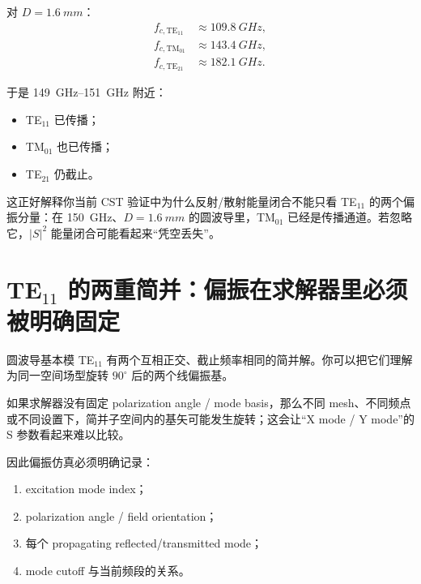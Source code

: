\documentclass[11pt,a4paper,openany]{ctexrep}
\begin{document}
对 $D=\SI{1.6}{mm}$：
\[
\boxed{
\begin{aligned}
f_{c,\mathrm{TE}_{11}}&\approx\SI{109.8}{GHz},\\
f_{c,\mathrm{TM}_{01}}&\approx\SI{143.4}{GHz},\\
f_{c,\mathrm{TE}_{21}}&\approx\SI{182.1}{GHz}.
\end{aligned}}
\]

于是 \SIrange{149}{151}{GHz} 附近：
\begin{itemize}
  \item TE$_{11}$ 已传播；
  \item TM$_{01}$ 也已传播；
  \item TE$_{21}$ 仍截止。
\end{itemize}

\begin{projectbox}
这正好解释你当前 CST 验证中为什么反射/散射能量闭合不能只看 TE$_{11}$ 的两个偏振分量：在 \SI{150}{GHz}、$D=\SI{1.6}{mm}$ 的圆波导里，TM$_{01}$ 已经是传播通道。若忽略它，$|S|^2$ 能量闭合可能看起来“凭空丢失”。
\end{projectbox}

\section{TE$_{11}$ 的两重简并：偏振在求解器里必须被明确固定}

圆波导基本模 TE$_{11}$ 有两个互相正交、截止频率相同的简并解。你可以把它们理解为同一空间场型旋转 $90^\circ$ 后的两个线偏振基。

\begin{center}
\end{center}

如果求解器没有固定 polarization angle / mode basis，那么不同 mesh、不同频点或不同设置下，简并子空间内的基矢可能发生旋转；这会让“X mode / Y mode”的 S 参数看起来难以比较。

因此偏振仿真必须明确记录：
\begin{enumerate}
  \item excitation mode index；
  \item polarization angle / field orientation；
  \item 每个 propagating reflected/transmitted mode；
  \item mode cutoff 与当前频段的关系。
\end{enumerate}
\end{document}
